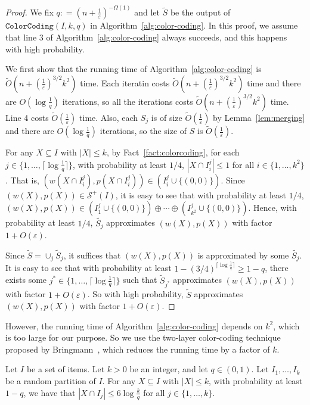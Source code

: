 \documentclass[a4paper,UKenglish,cleveref, autoref, thm-restate, pdfa]{lipics-v2021}
\newcommand{\eps}{\varepsilon}
\renewcommand{\leq}{\leqslant}
\renewcommand{\geq}{\geqslant}
\begin{document}
\begin{proof}
    
    We fix $q: = (n + \frac{1}{\eps})^{-\Omega(1)}$ and let $\tilde{S}$ be the output of $\mathtt{ColorCoding}(I, k, q)$ in Algorithm~\ref{alg:color-coding}. In this proof, we assume that line 3 of  Algorithm~\ref{alg:color-coding} always succeeds, and this happens with high probability.
    
    We first show that the running time of Algorithm~\ref{alg:color-coding} is  $\tilde{O}(n + (\frac{1}{\eps})^{3/2}k^2)$ time. Each iteratin costs $\tilde{O}(n + (\frac{1}{\eps})^{3/2}k^2)$ time and there are $O(\log \frac{1}{q})$ iterations, so all the iterations costs  $\tilde{O}(n + (\frac{1}{\eps})^{3/2}k^2)$ time. Line 4 costs $\tilde{O}(\frac{1}{\eps})$ time. Also, each $S_j$ is of size $\tilde{O}(\frac{1}{\eps})$ by Lemma~\ref{lem:merging} and there are $O(\log \frac{1}{q})$ iterations, so the size of $S$ is $\tilde{O}(\frac{1}{\eps})$.

    For any $X\subseteq I$ with $|X|\leq k$,
    by Fact~\ref{fact:colorcoding}, for each $j\in\{1,\ldots,\lceil \log \frac{1}{q} \rceil\}$, with probability at least $1/4$, $|X\cap I^j_i|\leq 1$ for all $i\in \{1, \ldots, k^2\}$. That is, $(w(X\cap I^j_i),p(X\cap I^j_i))\in (I^j_i\cup\{(0,0)\})$. Since $(w(X),p(X))\in \mathcal{S}^+(I)$, it is easy to see that with probability at least $1/4$, $(w(X),p(X))\in (I^j_1\cup\{(0,0)\}) \oplus \cdots \oplus (I^j_{k^2}\cup\{(0,0)\})$. Hence, with probability at least $1/4$, $\tilde{S_j}$ approximates $(w(X), p(X))$ with factor $1 + O(\eps)$.

   Since $\tilde{S}=\cup_{j}\tilde{S}_j$, it suffices that $(w(X), p(X))$ is approximated by some $\tilde{S_j}$. It is easy to see that with probability at least $1-(3/4)^{\lceil \log \frac{1}{q} \rceil} \geq 1-q$, there exists some $j^*\in \{1,\ldots,\lceil \log \frac{1}{q} \rceil\}$ such that $\tilde{S}_{j^*}$ approximates $(w(X), p(X))$ with factor $1 + O(\eps)$. So with high probability, $\tilde{S}$ approximates $(w(X), p(X))$ with factor $1 + O(\eps)$.
\end{proof}

However, the running time of Algorithm~\ref{alg:color-coding} depends on $k^2$, which is too large for our purpose. So we use the two-layer color-coding technique proposed by Bringmann~\cite{Bri17}, which reduces the running time by a factor of $k$.

\begin{lemma}\label{lem:first-layer-color-coding}
    Let $I$ be a set of items. Let $k>0$ be an integer, and let $q\in (0,1)$. Let $I_1,\ldots,I_{k}$ be a random partition of $I$. For any $X\subseteq I$ with $|X|\leq k$, with probability at least $1-q$, we have that
    \(
        |X\cap I_j| \leq 6\log\frac{k}{q}
    \)
    for all $j \in \{1,\ldots, k\}$.
\end{lemma}
\end{document}
